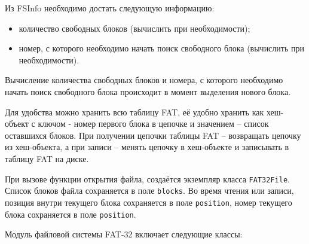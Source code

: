 Из FSInfo необходимо достать следующую информацию:

\begin{itemize}
\item количество свободных блоков (вычислить при необходимости);
\item номер, с которого необходимо начать поиск свободного блока (вычислить при необходимости).
\end{itemize}

Вычисление количества свободных блоков и номера, с которого необходимо начать поиск свободного блока происходит в момент выделения нового блока.

Для удобства можно хранить всю таблицу FAT, её удобно хранить как хеш-объект с ключом - номер первого блока в цепочке и значением -- список оставшихся блоков. При получении цепочки таблицы FAT -- возвращать цепочку из хеш-объекта, а при записи -- менять цепочку в хеш-объекте и записывать в таблицу FAT на диске.

При вызове функции открытия файла, создаётся экземпляр класса \texttt{FAT32File}. Список блоков файла сохраняется в поле \texttt{blocks}. Во время чтения или записи, позиция внутри текущего блока сохраняется в поле \texttt{position}, номер текущего блока сохраняется в поле \texttt{position}.

Модуль файловой системы FAT-32 включает следующие классы:

